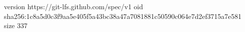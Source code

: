 version https://git-lfs.github.com/spec/v1
oid sha256:1c8a5d0c3f9aa5e405f5a43bc38a47a7081881c50590c064e7d2ef3715a7e581
size 337

